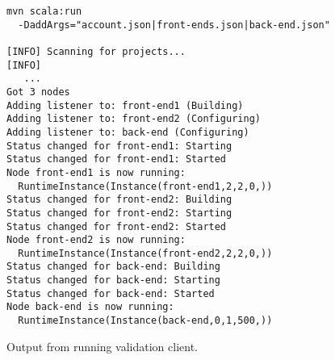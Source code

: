 \begin{figure}
  \begin{center}
    \begin{verbatim}
mvn scala:run 
  -DaddArgs="account.json|front-ends.json|back-end.json"

[INFO] Scanning for projects...
[INFO]
   ...
Got 3 nodes
Adding listener to: front-end1 (Building)
Adding listener to: front-end2 (Configuring)
Adding listener to: back-end (Configuring)
Status changed for front-end1: Starting
Status changed for front-end1: Started
Node front-end1 is now running: 
  RuntimeInstance(Instance(front-end1,2,2,0,))
Status changed for front-end2: Building
Status changed for front-end2: Starting
Status changed for front-end2: Started
Node front-end2 is now running: 
  RuntimeInstance(Instance(front-end2,2,2,0,))
Status changed for back-end: Building
Status changed for back-end: Starting
Status changed for back-end: Started
Node back-end is now running: 
  RuntimeInstance(Instance(back-end,0,1,500,))
    \end{verbatim}
  \end{center}
  \caption{Output from running validation client.}
  \label{list:validation-output}
\end{figure}

